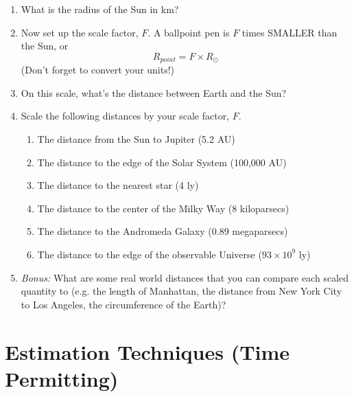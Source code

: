 \documentclass[11pt]{article}
\begin{document}
\begin{enumerate}
    \item What is the radius of the Sun in km?
    \item Now set up the scale factor, $F$.  A ballpoint pen is $F$ times SMALLER than the Sun, or $$R_{point} = F \times R_\odot$$  (Don't forget to convert your units!)
    \item On this scale, what's the distance between Earth and the Sun?
    \item Scale the following distances by your scale factor, $F$.
    \begin{enumerate}
        \item The distance from the Sun to Jupiter (5.2 AU)
        \item The distance to the edge of the Solar System (100,000 AU)
        \item The distance to the nearest star (4 ly)
        \item The distance to the center of the Milky Way (8 kiloparsecs)
        \item The distance to the Andromeda Galaxy (0.89 megaparsecs)
        \item The distance to the edge of the observable Universe ($93\times 10^9$ ly)
    \end{enumerate}
    \item \textit{Bonus:} What are some real world distances that you can compare each scaled quantity to (e.g. the length of Manhattan, the distance from New York City to Los Angeles, the circumference of the Earth)?
\end{enumerate}

\section{Estimation Techniques (Time Permitting)}
\end{document}
